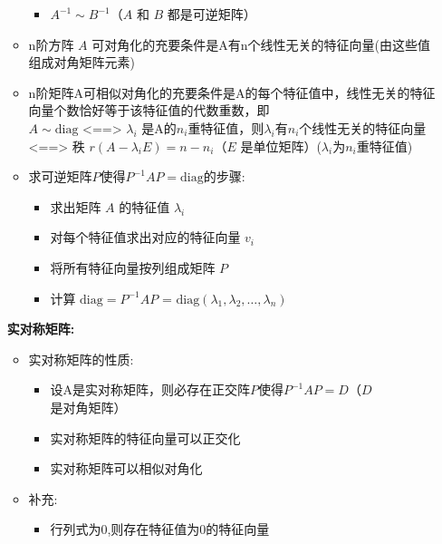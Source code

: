 \documentclass[10pt]{article}
\begin{document}
\begin{multicols}{2}
\begin{itemize}
\begin{itemize}
\begin{itemize}
          \item \(A^{-1} \sim B^{-1}\)（\(A\) 和 \(B\) 都是可逆矩阵）
        \end{itemize}
      \item n阶方阵 \(A\) 可对角化的充要条件是A有n个线性无关的特征向量(由这些值组成对角矩阵元素)
      \item n阶矩阵A可相似对角化的充要条件是A的每个特征值中，线性无关的特征向量个数恰好等于该特征值的代数重数，即\\
      \( A \sim \mathrm{diag} \) <==> \( \lambda_i \) 是A的\(n_i\)重特征值，则\(\lambda_i\)有\(n_i\)个线性无关的特征向量
      \\
      <==> 秩 \(r(A - \lambda_i E) = n - n_i\)（\(E\) 是单位矩阵）(\(\lambda_i\)为\(n_i\)重特征值)

      \item 求可逆矩阵\(P\)使得\( P^{-1}AP = \mathrm{diag}\)的步骤:
        \begin{itemize}
          \item 求出矩阵 \(A\) 的特征值 \(\lambda_i\)
          \item 对每个特征值求出对应的特征向量 \(v_i\)
          \item 将所有特征向量按列组成矩阵 \(P\)
          \item 计算 \(\mathrm{diag} = P^{-1}AP\) = \(\mathrm{diag}(\lambda_1, \lambda_2, \ldots, \lambda_n)\)
        \end{itemize}
      
    \end{itemize}
    
\textbf{实对称矩阵:}
  \begin{itemize}
  \item 实对称矩阵的性质:
    \begin{itemize}
      \item 设A是实对称矩阵，则必存在正交阵\(P\)使得\(P^{-1}AP = D\)（\(D\)是对角矩阵）
      \item 实对称矩阵的特征向量可以正交化
      \item 实对称矩阵可以相似对角化
    \end{itemize}
  \item 补充:
    \begin{itemize}
      \item 行列式为0,则存在特征值为0的特征向量
    \end{itemize}
  \end{itemize}

\end{itemize}


\end{multicols}
\end{document}
